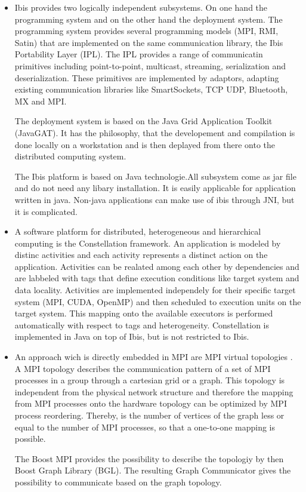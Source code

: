 \begin{itemize}
\item Ibis \cite{ref:ibis} provides two logically independent
  subsystems.  On one hand the programming system and on the other
  hand the deployment system. The programming system provides several
  programming models (MPI, RMI, Satin) that are implemented on the
  same communication library, the Ibis Portability Layer (IPL).  The
  IPL provides a range of communicatin primitives including
  point-to-point, multicast, streaming, serialization and
  deserialization. These primitives are implemented by adaptors,
  adapting existing communication libraries like SmartSockets, TCP
  UDP, Bluetooth, MX and MPI.

  The deployment system is based on the Java Grid Application Toolkit
  (JavaGAT).  It has the philosophy, that the developement and
  compilation is done locally on a workstation and is then deplayed
  from there onto the distributed computing system.

  The Ibis platform is based on Java technologie.All subsystem come as
  jar file and do not need any libary installation. It is easily
  applicable for application written in java. Non-java applications
  can make use of ibis through JNI, but it is complicated. 

\item A software platform for distributed, heterogeneous and
  hierarchical computing is the Constellation \cite{ref:constellation}
  framework. An application is modeled by distinc activities and each
  activity represents a distinct action on the application.
  Activities can be realated among each other by dependencies and are
  labbeled with tags that define execution conditions like target
  system and data locality.  Activities are implemented independely
  for their specific target system (MPI, CUDA, OpenMP) and then
  scheduled to execution units on the target system. This mapping onto
  the available executors is performed automatically with respect to
  tags and heterogeneity. Constellation is implemented in Java on top
  of Ibis, but is not restricted to Ibis. 

\item An approach wich is directly embedded in MPI are MPI virtual
  topologies \cite{ref:mpi_topology}. A MPI topology describes the
  communication pattern of a set of MPI processes in a group through a
  cartesian grid or a graph.  This topology is independent from the
  physical network structure and therefore the mapping from
  MPI processes onto the hardware topology can be optimized by MPI process
  reordering. Thereby, is the number of vertices of the graph less or equal
  to the number of MPI processes, so that a one-to-one mapping is possible.

  The Boost MPI provides the possibility to describe the topologiy by
  then Boost Graph Library (BGL)\cite{ref:boost_bgl}.  The resulting
  Graph Communicator \cite{ref:boost_graph_communicator} gives the
  possibility to communicate based on the graph topology.

\end{itemize}


\cleardoublepage

